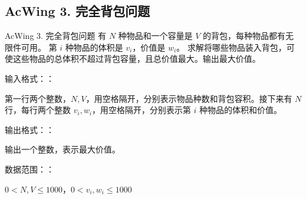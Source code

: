 \subsection{AcWing 3. 完全背包问题}
\begin{titledbox}{AcWing 3. 完全背包问题}
    有 $N$ 种物品和一个容量是 $V$ 的背包，每种物品都有无限件可用。 第 $i$ 种物品的体积是 $v_i$，价值是 $w_i$。 求解将哪些物品装入背包，可使这些物品的总体积不超过背包容量，且总价值最大。输出最大价值。

    输入格式：：

    第一行两个整数，$N, V$，用空格隔开，分别表示物品种数和背包容积。接下来有 $N$ 行，每行两个整数 $v_i, w_i$，用空格隔开，分别表示第 $i$ 种物品的体积和价值。

    输出格式：：

    输出一个整数，表示最大价值。

    数据范围：：

    $0  < N, V \le 1000$，$0  < v_i, w_i \le 1000$

    \begin{inputblock}
         \\
         \\
         \\
         \\
    \end{inputblock}
    \begin{outputblock}
    \end{outputblock}
\end{titledbox}

